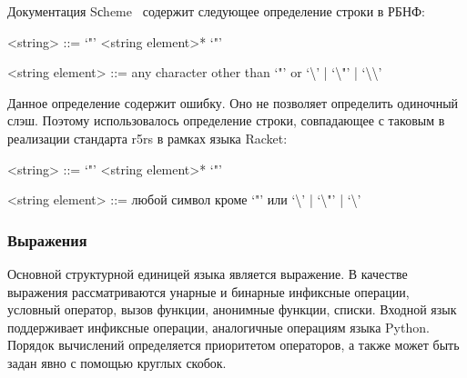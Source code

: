 \documentclass[12pt,a4paper,oneside]{extarticle}
\begin{document}
            Документация Sсheme~\cite{r5rs} содержит следующее определение строки в РБНФ:
            \begin{grammar}
                <string> ::= `"' <string element>* `"'

                <string element> ::= any character other than `"' or `\textbackslash' | `\textbackslash "' | `\textbackslash \textbackslash'
            \end{grammar}
            Данное определение содержит ошибку.
            Оно не позволяет определить одиночный слэш.
            Поэтому использовалось определение строки, совпадающее с таковым в реализации стандарта r5rs в рамках языка Racket: 
            \begin{grammar}
                <string> ::= `"' <string element>* `"'

                <string element> ::= любой символ кроме `"' или `\textbackslash' | `\textbackslash "' | `\textbackslash'
            \end{grammar}

        \subsubsection{Выражения}
            Основной структурной единицей языка является выражение.
            В качестве выражения рассматриваются унарные и бинарные инфиксные операции, условный оператор, вызов функции, анонимные функции, списки.
            Входной язык поддерживает инфиксные операции, аналогичные операциям языка Python.
            Порядок вычислений определяется приоритетом операторов, а также может быть задан явно с помощью круглых скобок.
\end{document}

